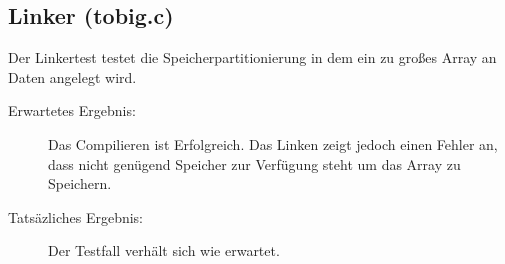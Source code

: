         \subsection{Linker (tobig.c)}
            Der Linkertest testet die Speicherpartitionierung in dem ein zu großes
            Array an Daten angelegt wird.

            \begin{description}
                \item[Erwartetes Ergebnis:] Das Compilieren ist Erfolgreich.
                Das Linken zeigt jedoch einen Fehler an, dass nicht genügend Speicher
                zur Verfügung steht um das Array zu Speichern. 
                \item[Tatsäzliches Ergebnis:] Der Testfall verhält sich wie erwartet.
            \end{description}


